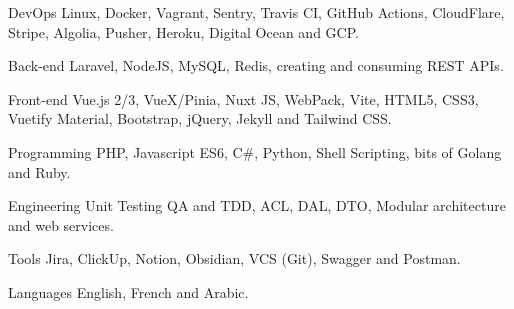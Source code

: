 

\begin{cvskills}

  \cvskill
    {DevOps} %
    {Linux, Docker, Vagrant, Sentry, Travis CI, GitHub Actions, CloudFlare, Stripe, Algolia, Pusher, Heroku, Digital Ocean and GCP.} %

  \cvskill
    {Back-end} %
    {Laravel, NodeJS, MySQL, Redis, creating and consuming REST APIs.} %

  \cvskill
    {Front-end} %
    {Vue.js 2/3, VueX/Pinia, Nuxt JS, WebPack, Vite, HTML5, CSS3, Vuetify Material, Bootstrap, jQuery, Jekyll and Tailwind CSS.} %

  \cvskill
    {Programming} %
    {PHP, Javascript ES6, C\#, Python, Shell Scripting, bits of Golang and Ruby.} %

  \cvskill
    {Engineering} %
    {Unit Testing QA and TDD, ACL, DAL, DTO, Modular architecture and web services.} %

  \cvskill
    {Tools} %
    {Jira, ClickUp, Notion, Obsidian, VCS (Git), Swagger and Postman.} %


  \cvskill
    {Languages} %
    {English, French and Arabic.} %

\end{cvskills}
